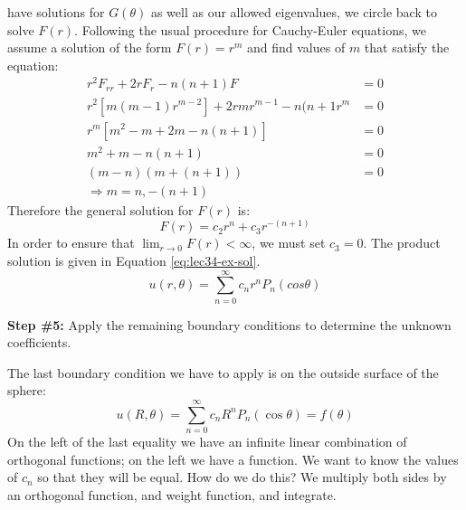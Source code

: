  have solutions for $G(\theta)$ as well as our allowed eigenvalues, we circle back to solve $F(r)$.  Following the usual procedure for Cauchy-Euler equations, we assume a solution of the form $F(r)=r^m$ and find values of $m$ that satisfy the equation:
\begin{align*}
r^2F_{rr} + 2rF_r - n(n+1)F &= 0 \\
r^2\left[m(m-1)r^{m-2}\right]+2rmr^{m-1}-n(n+1r^m &= 0 \\
r^m\left[m^2-m+2m-n(n+1) \right] &= 0 \\
m^2+m-n(n+1) &= 0 \\
(m-n)(m+(n+1)) &= 0 \\
\Rightarrow m = n, -(n+1)
\end{align*}
Therefore the general solution for $F(r)$ is:
\begin{equation*}
F(r) = c_2r^n + c_3r^{-(n+1)}
\end{equation*}
In order to ensure that $\lim_{r \to 0} F(r)<\infty$, we must set $c_3 = 0$.  The product solution is given in Equation \ref{eq:lec34-ex-sol}. 
\begin{equation}
u(r,\theta) = \sum\limits_{n=0}^{\infty} c_n r^nP_n(cos{\theta})
\label{eq:lec34-ex-sol}
\end{equation}

\vspace{0.25cm}

\noindent\textbf{Step \#5:} Apply the remaining boundary conditions to determine the unknown coefficients.

\vspace{0.25cm}

\noindent The last boundary condition we have to apply is on the outside surface of the sphere:
\begin{equation*}
u(R,\theta) = \sum\limits_{n=0}^{\infty}c_n R^n P_n(\cos{\theta}) = f(\theta)
\end{equation*}
On the left of the last equality we have an infinite linear combination of orthogonal functions; on the left we have a function.  We want to know the values of $c_n$ so that they will be equal.  How do we do this?  We multiply both sides by an orthogonal function, and weight function, and integrate.

